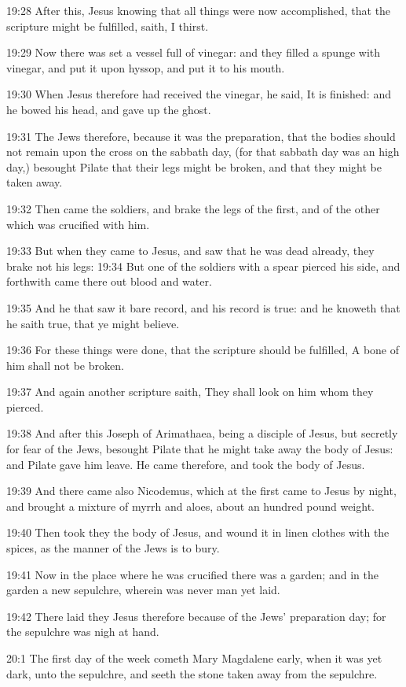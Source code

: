 19:28 After this, Jesus knowing that all things were now accomplished,
that the scripture might be fulfilled, saith, I thirst.

19:29 Now there was set a vessel full of vinegar: and they filled a
spunge with vinegar, and put it upon hyssop, and put it to his mouth.

19:30 When Jesus therefore had received the vinegar, he said, It is
finished: and he bowed his head, and gave up the ghost.

19:31 The Jews therefore, because it was the preparation, that the
bodies should not remain upon the cross on the sabbath day, (for that
sabbath day was an high day,) besought Pilate that their legs might be
broken, and that they might be taken away.

19:32 Then came the soldiers, and brake the legs of the first, and of
the other which was crucified with him.

19:33 But when they came to Jesus, and saw that he was dead already,
they brake not his legs: 19:34 But one of the soldiers with a spear
pierced his side, and forthwith came there out blood and water.

19:35 And he that saw it bare record, and his record is true: and he
knoweth that he saith true, that ye might believe.

19:36 For these things were done, that the scripture should be
fulfilled, A bone of him shall not be broken.

19:37 And again another scripture saith, They shall look on him whom
they pierced.

19:38 And after this Joseph of Arimathaea, being a disciple of Jesus,
but secretly for fear of the Jews, besought Pilate that he might take
away the body of Jesus: and Pilate gave him leave. He came therefore,
and took the body of Jesus.

19:39 And there came also Nicodemus, which at the first came to Jesus
by night, and brought a mixture of myrrh and aloes, about an hundred
pound weight.

19:40 Then took they the body of Jesus, and wound it in linen clothes
with the spices, as the manner of the Jews is to bury.

19:41 Now in the place where he was crucified there was a garden; and
in the garden a new sepulchre, wherein was never man yet laid.

19:42 There laid they Jesus therefore because of the Jews' preparation
day; for the sepulchre was nigh at hand.

20:1 The first day of the week cometh Mary Magdalene early, when it
was yet dark, unto the sepulchre, and seeth the stone taken away from
the sepulchre.


